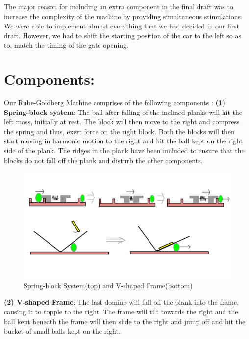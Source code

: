 \documentclass{article}
\begin{document}
The major reason for including an extra component in the final draft was to increase the complexity of the machine by providing simultaneous stimulations. We were able to implement almost everything that we had decided in our first draft. However, we had to shift the starting position of the car to the left so as to, match the timing of the gate opening.

\newpage

\section*{Components:}
Our Rube-Goldberg Machine comprises of the following components  :
{\bf \newline (1) Spring-block system}: The ball after falling of the inclined planks will hit the left mass, initially at rest. The block will then move to the right and compress the spring and thus, exert force on the right block. Both the blocks will then start moving in harmonic motion to the right and hit the ball kept on the right side of the plank. The ridges in the plank have been included to ensure that the blocks do not fall off the plank and disturb the other components.

\begin{figure} [h]
    \centering
    \includegraphics [scale=0.2] {images/spring_block_V.png}
    \caption{Spring-block System(top) and V-shaped Frame(bottom)}
\end{figure} 

{\bf (2) V-shaped Frame}: The last domino will fall off the plank into the frame, causing it to topple to the right. The frame will tilt towards the right and the ball kept beneath the frame will then slide to the right and jump off and hit the bucket of small balls kept on the right.
\newline
\end{document}
